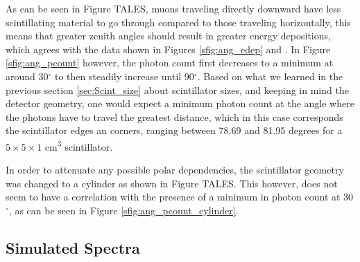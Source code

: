 As can be seen in Figure TALES, muons traveling directly downward have less scintillating material to go through compared to those traveling horizontally, this means that greater zenith angles should result in greater energy depositions, which agrees with the data shown in Figures \ref{sfig:ang_edep} and . In Figure \ref{sfig:ang_pcount} however, the photon count first decreases to a minimum at around 30$^\circ$ to then steadily increase until 90$^\circ$. Based on what we learned in the previous section \ref{sec:Scint_size} about scintillator sizes, and keeping in mind the detector geometry, one would expect a minimum photon count at the angle where the photons have to travel the greatest distance, which in this case corresponds the scintillator edges an corners, ranging between 78.69 and 81.95 degrees for a $5\times5\times1$ \unit{\cm\cubed} scintillator.

In order to attenuate any possible polar dependencies, the scintillator geometry was changed to a cylinder as shown in Figure TALES. This however, does not seem to have a correlation with the presence of a minimum in photon count at 30$^\circ$, as can be seen in Figure \ref{sfig:ang_pcount_cylinder}.

\subsection{Simulated Spectra}